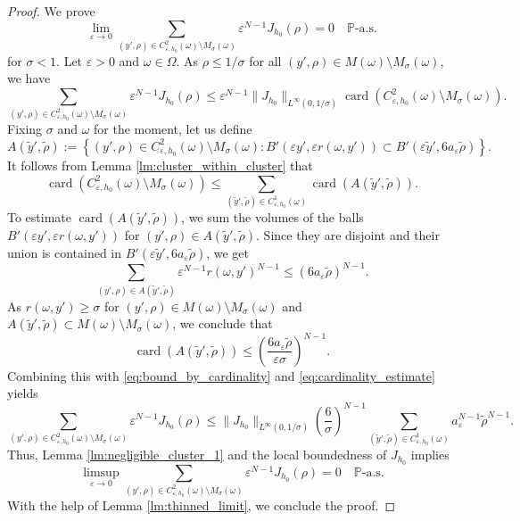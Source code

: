 \documentclass{article}
\numberwithin{equation}{section}
\theoremstyle{definition}
\theoremstyle{remark}
\newcommand{\card}{\operatorname{card}}
\begin{document}
\begin{proof}
    We prove
    \[
    \lim_{\varepsilon \to 0} \sum_{(y', \rho) \in C_{\varepsilon, h_0}^2(\omega) \setminus M_\sigma(\omega)} \varepsilon^{N - 1} J_{h_0}(\rho) = 0 \quad \mathbb{P}\text{-a.s.}
    \]
    for $\sigma < 1$. Let $\varepsilon > 0$ and $\omega \in \Omega$. As $\rho \le 1/\sigma$ for all $(y', \rho) \in M(\omega) \setminus M_\sigma(\omega)$, we have
    \begin{equation} \label{eq:bound_by_cardinality}
        \sum_{(y', \rho) \in C_{\varepsilon, h_0}^2(\omega) \setminus M_\sigma(\omega)} \varepsilon^{N - 1} J_{h_0}(\rho) \le \varepsilon^{N - 1} \|J_{h_0}\|_{L^\infty(0, 1/\sigma)} \card\left(C_{\varepsilon, h_0}^2(\omega) \setminus M_\sigma(\omega)\right).
    \end{equation}
    Fixing $\sigma$ and $\omega$ for the moment, let us define
    \[
    A(\tilde{y}', \tilde{\rho}) := \left\{(y', \rho) \in C_{\varepsilon, h_0}^2(\omega) \setminus M_\sigma(\omega) : B'(\varepsilon y', \varepsilon r(\omega, y')) \subset B'(\varepsilon \tilde{y}', 6 a_\varepsilon \tilde{\rho})\right\}.
    \]
    It follows from Lemma \ref{lm:cluster_within_cluster} that
    \begin{equation} \label{eq:cardinality_estimate}
        \card\left(C_{\varepsilon, h_0}^2(\omega) \setminus M_\sigma(\omega)\right) \le \sum_{(\tilde{y}', \tilde{\rho}) \in C_{\varepsilon, h_0}^1(\omega)} \card(A(\tilde{y}', \tilde{\rho})).
    \end{equation}
    To estimate $\card(A(\tilde{y}', \tilde{\rho}))$, we sum the volumes of the balls $B'(\varepsilon y', \varepsilon r(\omega, y'))$ for $(y', \rho) \in A(\tilde{y}', \tilde{\rho})$. Since they are disjoint and their union is contained in $B'(\varepsilon \tilde{y}', 6 a_\varepsilon \tilde{\rho})$, we get
    \[
    \sum_{(y', \rho) \in A(\tilde{y}', \tilde{\rho})} \varepsilon^{N - 1} r(\omega, y')^{N - 1} \le (6 a_\varepsilon \tilde{\rho})^{N - 1}.
    \]
    As $r(\omega, y') \ge \sigma$ for $(y', \rho) \in M(\omega) \setminus M_\sigma(\omega)$ and $A(\tilde{y}', \tilde{\rho}) \subset M(\omega) \setminus M_\sigma(\omega)$, we conclude that
    \[
    \card(A(\tilde{y}', \tilde{\rho})) \le \left(\frac{6 a_\varepsilon \tilde{\rho}}{\varepsilon \sigma}\right)^{N - 1}.
    \]
    Combining this with \eqref{eq:bound_by_cardinality} and \eqref{eq:cardinality_estimate} yields
    \begin{equation*}
        \sum_{(y', \rho) \in C_{\varepsilon, h_0}^2(\omega) \setminus M_\sigma(\omega)} \varepsilon^{N - 1} J_{h_0}(\rho) \le \|J_{h_0}\|_{L^\infty(0, 1/\sigma)}\left(\frac{6}{\sigma}\right)^{N - 1} \sum_{(\tilde{y}', \tilde{\rho}) \in C_{\varepsilon, h_0}^1(\omega)} a_\varepsilon^{N - 1} \tilde{\rho}^{N - 1}.
    \end{equation*}
    Thus, Lemma \ref{lm:negligible_cluster_1} and the local boundedness of $J_{h_0}$ implies
    \[
    \limsup_{\varepsilon \to 0} \sum_{(y', \rho) \in C_{\varepsilon, h_0}^2(\omega) \setminus M_\sigma(\omega)} \varepsilon^{N - 1} J_{h_0}(\rho) = 0 \quad \mathbb{P}\text{-a.s.}
    \]
    With the help of Lemma \ref{lm:thinned_limit}, we conclude the proof.
\end{proof}
\end{document}
